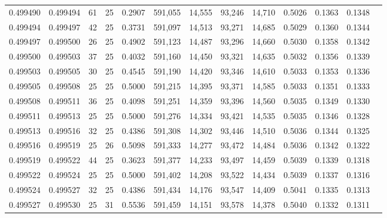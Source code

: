 \begin{tabular}{rrrrrrrrrrrrr}
0.499490 & 0.499494 &    61 &  25 &                                     0.2907 & 591,055 &  14,555 &  93,246 &  14,710 & 0.5026 & 0.1363 & 0.1348 \\
0.499494 & 0.499497 &    42 &  25 &                                     0.3731 & 591,097 &  14,513 &  93,271 &  14,685 & 0.5029 & 0.1360 & 0.1344 \\
0.499497 & 0.499500 &    26 &  25 &                                     0.4902 & 591,123 &  14,487 &  93,296 &  14,660 & 0.5030 & 0.1358 & 0.1342 \\
0.499500 & 0.499503 &    37 &  25 &                                     0.4032 & 591,160 &  14,450 &  93,321 &  14,635 & 0.5032 & 0.1356 & 0.1339 \\
0.499503 & 0.499505 &    30 &  25 &                                     0.4545 & 591,190 &  14,420 &  93,346 &  14,610 & 0.5033 & 0.1353 & 0.1336 \\
0.499505 & 0.499508 &    25 &  25 &                                     0.5000 & 591,215 &  14,395 &  93,371 &  14,585 & 0.5033 & 0.1351 & 0.1333 \\
0.499508 & 0.499511 &    36 &  25 &                                     0.4098 & 591,251 &  14,359 &  93,396 &  14,560 & 0.5035 & 0.1349 & 0.1330 \\
0.499511 & 0.499513 &    25 &  25 &                                     0.5000 & 591,276 &  14,334 &  93,421 &  14,535 & 0.5035 & 0.1346 & 0.1328 \\
0.499513 & 0.499516 &    32 &  25 &                                     0.4386 & 591,308 &  14,302 &  93,446 &  14,510 & 0.5036 & 0.1344 & 0.1325 \\
0.499516 & 0.499519 &    25 &  26 &                                     0.5098 & 591,333 &  14,277 &  93,472 &  14,484 & 0.5036 & 0.1342 & 0.1322 \\
0.499519 & 0.499522 &    44 &  25 &                                     0.3623 & 591,377 &  14,233 &  93,497 &  14,459 & 0.5039 & 0.1339 & 0.1318 \\
0.499522 & 0.499524 &    25 &  25 &                                     0.5000 & 591,402 &  14,208 &  93,522 &  14,434 & 0.5039 & 0.1337 & 0.1316 \\
0.499524 & 0.499527 &    32 &  25 &                                     0.4386 & 591,434 &  14,176 &  93,547 &  14,409 & 0.5041 & 0.1335 & 0.1313 \\
0.499527 & 0.499530 &    25 &  31 &                                     0.5536 & 591,459 &  14,151 &  93,578 &  14,378 & 0.5040 & 0.1332 & 0.1311 \\

\end{tabular}
